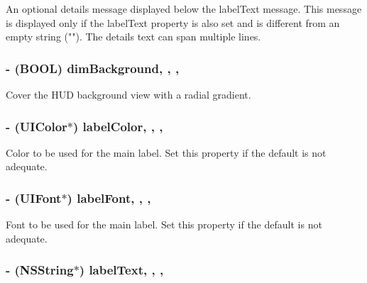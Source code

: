 An optional details message displayed below the label\+Text message. This message is displayed only if the label\+Text property is also set and is different from an empty string (""). The details text can span multiple lines. \hypertarget{interface_m_b_progress_h_u_d_ab781ccd4428c8eff6907d2cdc90fc3ee}{
\subsubsection[{dim\+Background}]{\setlength{\rightskip}{0pt plus 5cm}-\/ (B\+O\+O\+L) dim\+Background\hspace{0.3cm}{\ttfamily [read]}, {\ttfamily [write]}, {\ttfamily [atomic]}, {\ttfamily [assign]}}}\label{interface_m_b_progress_h_u_d_ab781ccd4428c8eff6907d2cdc90fc3ee}
Cover the H\+U\+D background view with a radial gradient. \hypertarget{interface_m_b_progress_h_u_d_a04eba696a66f65d28b485bb5f0a940cd}{
\subsubsection[{label\+Color}]{\setlength{\rightskip}{0pt plus 5cm}-\/ (U\+I\+Color$\ast$) label\+Color\hspace{0.3cm}{\ttfamily [read]}, {\ttfamily [write]}, {\ttfamily [atomic]}, {\ttfamily [assign]}}}\label{interface_m_b_progress_h_u_d_a04eba696a66f65d28b485bb5f0a940cd}
Color to be used for the main label. Set this property if the default is not adequate. \hypertarget{interface_m_b_progress_h_u_d_ae61e736a34f341f4190b065f19010af8}{
\subsubsection[{label\+Font}]{\setlength{\rightskip}{0pt plus 5cm}-\/ (U\+I\+Font$\ast$) label\+Font\hspace{0.3cm}{\ttfamily [read]}, {\ttfamily [write]}, {\ttfamily [atomic]}, {\ttfamily [assign]}}}\label{interface_m_b_progress_h_u_d_ae61e736a34f341f4190b065f19010af8}
Font to be used for the main label. Set this property if the default is not adequate. \hypertarget{interface_m_b_progress_h_u_d_a531706887f08881c7f13b4309521b299}{
\subsubsection[{label\+Text}]{\setlength{\rightskip}{0pt plus 5cm}-\/ (N\+S\+String$\ast$) label\+Text\hspace{0.3cm}{\ttfamily [read]}, {\ttfamily [write]}, {\ttfamily [atomic]}, {\ttfamily [copy]}}}\label{interface_m_b_progress_h_u_d_a531706887f08881c7f13b4309521b299}
